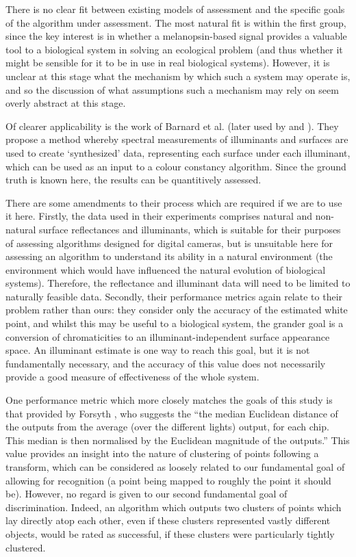 There is no clear fit between existing models of assessment and the specific goals of the algorithm under assessment. The most natural fit is within the first group, since the key interest is in whether a melanopsin-based signal provides a valuable tool to a biological system in solving an ecological problem (and thus whether it might be sensible for it to be in use in real biological systems). However, it is unclear at this stage what the mechanism by which such a system may operate is, and so the discussion of what assumptions such a mechanism may rely on seem overly abstract at this stage.

Of clearer applicability is the work of Barnard et al. \cite{barnard_comparison_2002} (later used by \citet{hordley_reevaluation_2006} and \citet{gijsenij_computational_2011}). They propose a method whereby spectral measurements of illuminants and surfaces are used to create `synthesized' data, representing each surface under each illuminant, which can be used as an input to a colour constancy algorithm. Since the ground truth is known here, the results can be quantitively assessed. 

There are some amendments to their process which are required if we are to use it here. Firstly, the data used in their experiments comprises natural and non-natural surface reflectances and illuminants, which is suitable for their purposes of assessing algorithms designed for digital cameras, but is unsuitable here for assessing an algorithm to understand its ability in a natural environment (the environment which would have influenced the natural evolution of biological systems). Therefore, the reflectance and illuminant data will need to be limited to naturally feasible data. Secondly, their performance metrics again relate to their problem rather than ours: they consider only the accuracy of the estimated white point, and whilst this may be useful to a biological system, the grander goal is a conversion of chromaticities to an illuminant-independent surface appearance space. An illuminant estimate is one way to reach this goal, but it is not fundamentally necessary, and the accuracy of this value does not necessarily provide a good measure of effectiveness of the whole system.

One performance metric which more closely matches the goals of this study is that provided by Forsyth \cite[p.~19]{forsyth_novel_1990}, who suggests the ``the median Euclidean distance of the outputs from the average (over the different lights) output, for each chip. This median is then normalised by the Euclidean magnitude of the outputs.'' This value provides an insight into the nature of clustering of points following a transform, which can be considered as loosely related to our fundamental goal of allowing for recognition (a point being mapped to roughly the point it should be). However, no regard is given to our second fundamental goal of discrimination. Indeed, an algorithm which outputs two clusters of points which lay directly atop each other, even if these clusters represented vastly different objects, would be rated as successful, if these clusters were particularly tightly clustered.

